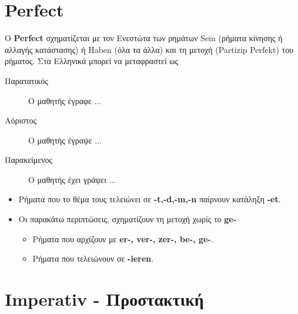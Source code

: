 \begin{appendix}
 
 \section{Perfect}
 O \textbf{Perfect} σχηματίζεται με τον Ενεστώτα των ρημάτων Sein (ρήματα
κίνησης ή αλλαγής κατάστασης) ή Haben (όλα τα άλλα) και τη μετοχή (Partizip
Perfekt) του ρήματος. Στα Ελληνικά μπορεί να μεταφραστεί ως 
 \begin{description}
  \item[Παρατατικός] Ο μαθητής έγραφε ...
  \item[Αόριστος] Ο μαθητής έγραψε ...
  \item[Παρακείμενος] Ο μαθητής έχει γράψει ... 
 \end{description}
 
 \begin{itemize}
  \item Ρήματα που το θέμα τους τελειώνει σε  \textbf{-t,-d,-m,-n} παίρνουν
κατάληξη \textbf{-et}.
  \item Οι παρακάτω περιπτώσεις, σχηματίζουν τη μετοχή χωρίς το \textbf{ge-}
  \begin{itemize}
    \item Ρήματα που αρχίζουν με \textbf{er-, ver-, zer-, be-, ge-}.
    \item Ρήματα που τελειώνουν σε \textbf{-ieren}.
  \end{itemize}
  \end{itemize}

 
 
 \section{Imperativ - Προστακτική}
 
 
 
\end{appendix}
